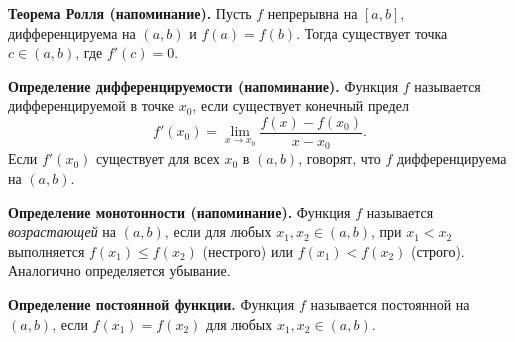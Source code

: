 
\textbf{Теорема Ролля (напоминание).}
Пусть $f$ непрерывна на $[a,b]$, дифференцируема на $(a,b)$ и $f(a)=f(b)$. Тогда существует точка $c\in(a,b)$, где $f'(c)=0$.

\textbf{Определение дифференцируемости (напоминание).}
Функция $f$ называется дифференцируемой в точке $x_0$, если существует конечный предел
\[
f'(x_0) = \lim_{x\to x_0} \frac{f(x)-f(x_0)}{x - x_0}.
\]
Если $f'(x_0)$ существует для всех $x_0$ в $(a,b)$, говорят, что $f$ дифференцируема на $(a,b)$.

\textbf{Определение монотонности (напоминание).}
Функция $f$ называется \emph{возрастающей} на $(a,b)$, если для любых $x_1,x_2\in(a,b)$, при $x_1 < x_2$ выполняется $f(x_1)\le f(x_2)$ (нестрого) или $f(x_1)<f(x_2)$ (строго).  
Аналогично определяется убывание.

\textbf{Определение постоянной функции.}
Функция $f$ называется постоянной на $(a,b)$, если $f(x_1)=f(x_2)$ для любых $x_1,x_2\in(a,b)$.

